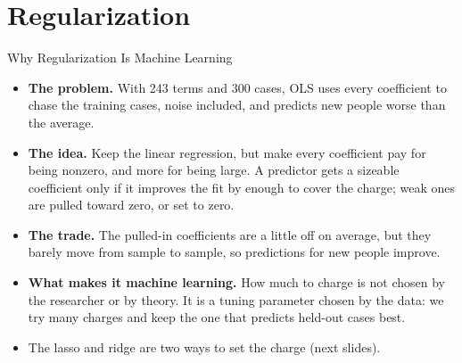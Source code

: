 \documentclass[aspectratio=169,11pt,xcolor=dvipsnames]{beamer}
\newcommand{\core}{\,\raisebox{0.6pt}{\textcolor{corestar}{$\bigstar$}}}
\begin{document}
\section[Regularization]{Regularization}
\begin{frame}\sectionpage\end{frame}

\begin{frame}{Why Regularization Is Machine Learning\core}
\begin{itemize}\itemsep5pt
  \item \textbf{The problem.} With 243 terms and 300 cases, OLS uses every coefficient to chase
        the training cases, noise included, and predicts new people worse than the average.
  \item \textbf{The idea.} Keep the linear regression, but make every coefficient pay for being
        nonzero, and more for being large. A predictor gets a sizeable coefficient only if it improves the fit by enough
        to cover the charge; weak ones are pulled toward zero, or set to zero.
  \item \textbf{The trade.} The pulled-in coefficients are a little off on average, but they
        barely move from sample to sample, so predictions for new people improve.
  \item \textbf{What makes it machine learning.} How much to charge is not chosen by the
        researcher or by theory. It is a tuning parameter chosen by the data: we try many
        charges and keep the one that predicts held-out cases best.
  \item The lasso and ridge are two ways to set the charge (next slides).
\end{itemize}
\end{frame}
\end{document}
